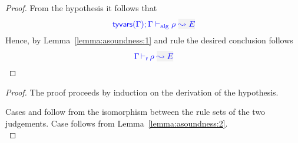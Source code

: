 \begin{proof}
  From the hypothesis it follows that 
\begin{equation*}
  \adrres{\tyvars{\tenv}}{\tenv}{\rulet}{E}
\end{equation*}
  Hence, by Lemma~\ref{lemma:asoundness:1} and rule  the desired conclusion follows
\begin{equation*}
  \dres{\tenv}{\rulet}{E}
\end{equation*}
\end{proof}


{\centering
{}}

\begin{proof}
The proof proceeds by induction on the derivation of the hypothesis.

Cases  and  follow from the isomorphism
between the rule sets of the two judgements. Case  follows
from Lemma~\ref{lemma:asoundness:2}.\\
\end{proof}


{\centering
{}}

